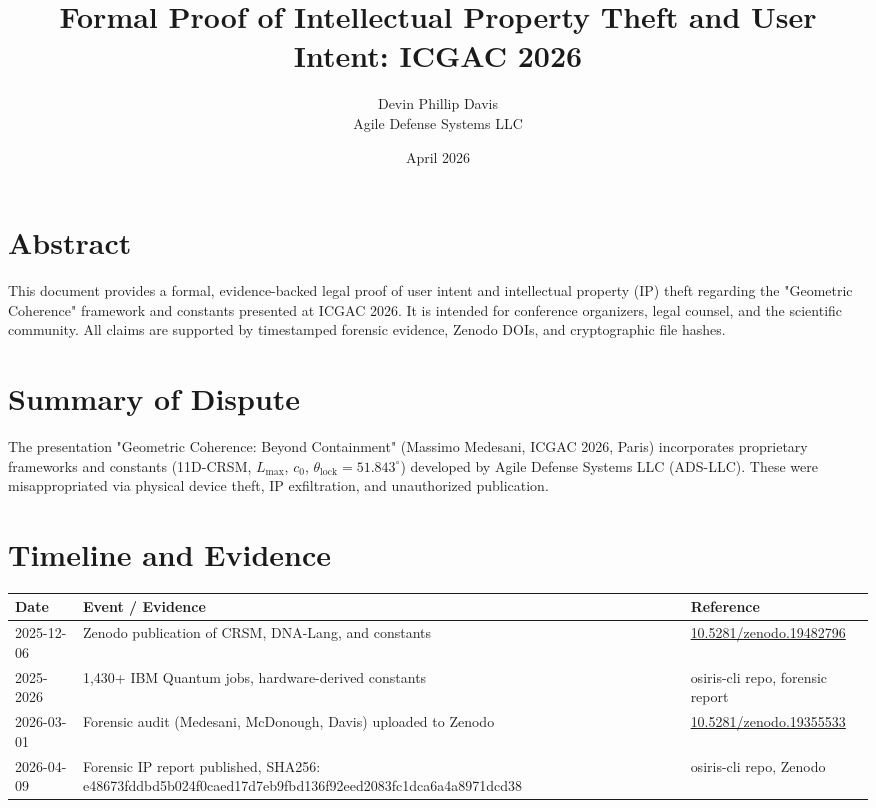 \documentclass[12pt]{article}
\title{Formal Proof of Intellectual Property Theft and User Intent: ICGAC 2026}
\author{Devin Phillip Davis \\ Agile Defense Systems LLC}
\date{April 2026}
\begin{document}
\maketitle

\section*{Abstract}
This document provides a formal, evidence-backed legal proof of user intent and intellectual property (IP) theft regarding the "Geometric Coherence" framework and constants presented at ICGAC 2026. It is intended for conference organizers, legal counsel, and the scientific community. All claims are supported by timestamped forensic evidence, Zenodo DOIs, and cryptographic file hashes.

\section{Summary of Dispute}
The presentation "Geometric Coherence: Beyond Containment" (Massimo Medesani, ICGAC 2026, Paris) incorporates proprietary frameworks and constants (11D-CRSM, $L_{\max}$, $c_0$, $\theta_{\mathrm{lock}} = 51.843^\circ$) developed by Agile Defense Systems LLC (ADS-LLC). These were misappropriated via physical device theft, IP exfiltration, and unauthorized publication.

\section{Timeline and Evidence}
\begin{longtable}{|p{3cm}|p{8cm}|p{4cm}|}
\hline
\textbf{Date} & \textbf{Event / Evidence} & \textbf{Reference} \\
\hline
2025-12-06 & Zenodo publication of CRSM, DNA-Lang, and constants & \href{https://doi.org/10.5281/zenodo.19482796}{10.5281/zenodo.19482796} \\
\hline
2025-2026 & 1,430+ IBM Quantum jobs, hardware-derived constants & osiris-cli repo, forensic report \\
\hline
2026-03-01 & Forensic audit (Medesani, McDonough, Davis) uploaded to Zenodo & \href{https://doi.org/10.5281/zenodo.19355533}{10.5281/zenodo.19355533} \\
\hline
2026-04-09 & Forensic IP report published, SHA256: e48673fddbd5b024f0caed17d7eb9fbd136f92eed2083fc1dca6a4a8971dcd38 & osiris-cli repo, Zenodo \\
\hline
\end{longtable}
\end{document}
